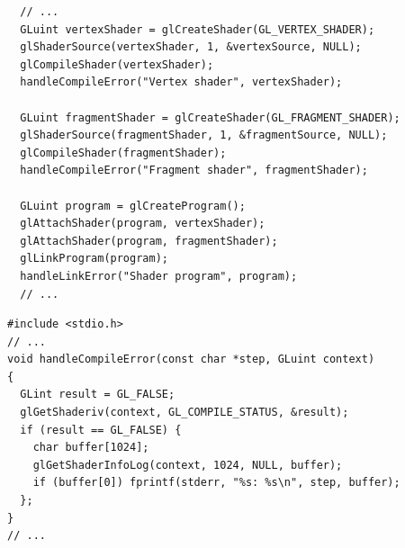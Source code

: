 \documentclass[calcdimensions,landscape,letterpaper]{powersem}
\newcommand{\thecurrentheading}{}
\newcommand{\heading}[1]{\renewcommand{\thecurrentheading}{#1}}
\begin{document}
\begin{slide}
    \heading{Minimal Pipeline: Compile \& Link Shaders}
    \begin{center}
        \begin{minipage}[c]{.95\textwidth}
            \begin{verbatim}
  // ...
  GLuint vertexShader = glCreateShader(GL_VERTEX_SHADER);
  glShaderSource(vertexShader, 1, &vertexSource, NULL);
  glCompileShader(vertexShader);
  handleCompileError("Vertex shader", vertexShader);

  GLuint fragmentShader = glCreateShader(GL_FRAGMENT_SHADER);
  glShaderSource(fragmentShader, 1, &fragmentSource, NULL);
  glCompileShader(fragmentShader);
  handleCompileError("Fragment shader", fragmentShader);

  GLuint program = glCreateProgram();
  glAttachShader(program, vertexShader);
  glAttachShader(program, fragmentShader);
  glLinkProgram(program);
  handleLinkError("Shader program", program);
  // ...
            \end{verbatim}
        \end{minipage}
    \end{center}
\end{slide}

\begin{slide}
    \heading{Minimal Pipeline: Compile Errors}
    \begin{center}
        \begin{minipage}[c]{.95\textwidth}
            \begin{verbatim}
#include <stdio.h>
// ...
void handleCompileError(const char *step, GLuint context)
{
  GLint result = GL_FALSE;
  glGetShaderiv(context, GL_COMPILE_STATUS, &result);
  if (result == GL_FALSE) {
    char buffer[1024];
    glGetShaderInfoLog(context, 1024, NULL, buffer);
    if (buffer[0]) fprintf(stderr, "%s: %s\n", step, buffer);
  };
}
// ...
            \end{verbatim}
        \end{minipage}
    \end{center}
\end{slide}
\end{document}
